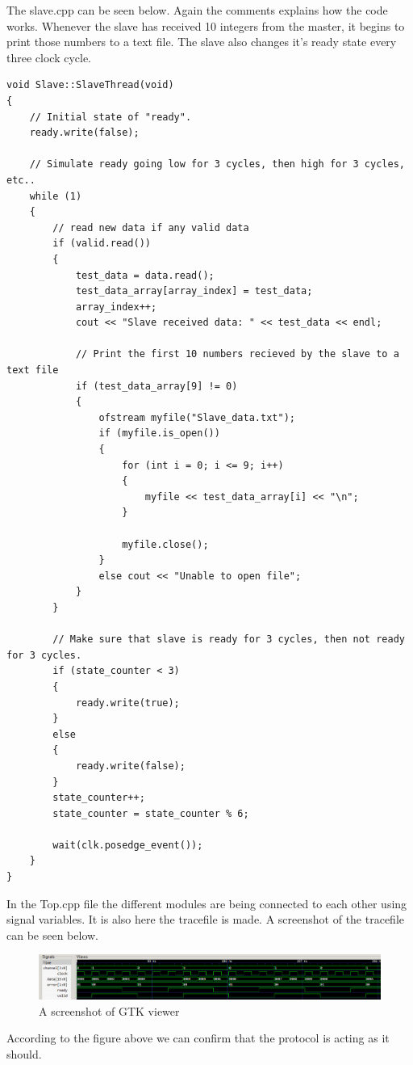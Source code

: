 The slave.cpp can be seen below. Again the comments explains how the code works. Whenever the slave has received 10 integers from the master, it begins to print those numbers to a text file. The slave also changes it's ready state every three clock cycle.  

\begin{lstlisting}
void Slave::SlaveThread(void)
{
	// Initial state of "ready".
	ready.write(false);
	
	// Simulate ready going low for 3 cycles, then high for 3 cycles, etc..
	while (1)
	{
		// read new data if any valid data
		if (valid.read())
		{
			test_data = data.read();
			test_data_array[array_index] = test_data;
			array_index++;
			cout << "Slave received data: " << test_data << endl;
			
			// Print the first 10 numbers recieved by the slave to a text file
			if (test_data_array[9] != 0)
			{
				ofstream myfile("Slave_data.txt");
				if (myfile.is_open())
				{
					for (int i = 0; i <= 9; i++)
					{
						myfile << test_data_array[i] << "\n";
					}
					
					myfile.close();
				}
				else cout << "Unable to open file";
			}
		}
		
		// Make sure that slave is ready for 3 cycles, then not ready for 3 cycles.
		if (state_counter < 3)
		{
			ready.write(true);
		}
		else
		{
			ready.write(false);
		}
		state_counter++;
		state_counter = state_counter % 6;
		
		wait(clk.posedge_event());
	}
}
\end{lstlisting}

In the Top.cpp file the different modules are being connected to each other using signal variables. It is also here the tracefile is made. A screenshot of the tracefile can be seen below.

\begin{figure}[H]
	\centering
	\includegraphics[width=\textwidth]{Images/GTK_3_4.png}
	\caption{A screenshot of GTK viewer}
	\label{fig:GTK_Viewer}
\end{figure}

According to the figure above we can confirm that the protocol is acting as it should.
